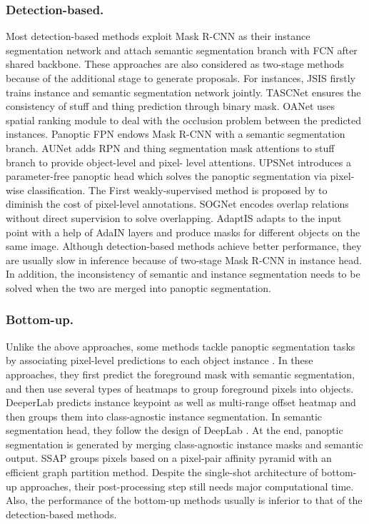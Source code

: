 \documentclass[runningheads]{llncs}
\begin{document}
\subsubsection{Detection-based.}	
Most detection-based methods exploit Mask R-CNN \cite{He2017} as their instance segmentation network and attach semantic segmentation branch with FCN \cite{Long2015} after shared backbone. These approaches are also considered as two-stage methods because of the additional stage to generate proposals. For instances, JSIS \cite{DeGeus2018} firstly trains instance and semantic segmentation network jointly. TASCNet \cite{Li2018a} ensures the consistency of stuff and thing prediction through binary mask. OANet \cite{Liu2019} uses spatial ranking module to deal with the occlusion problem between the predicted instances. Panoptic FPN \cite{DeGeus2018a} endows Mask R-CNN \cite{He2017} with a semantic segmentation branch. AUNet \cite{Li2018c} adds RPN and thing segmentation mask attentions to stuff branch to provide object-level and pixel- level attentions. UPSNet \cite{Xiong2019} introduces a parameter-free panoptic head which solves the panoptic segmentation via pixel-wise classification. The First  weakly-supervised method is proposed by \cite{Li2018b} to diminish the cost of pixel-level annotations. SOGNet \cite{Yang2019a} encodes overlap relations without direct supervision to solve overlapping. AdaptIS \cite{Sofiiuk2019} adapts to the input point with a help of AdaIN layers \cite{Karras2019} and produce masks for different objects on the same image. Although detection-based methods achieve better performance, they are usually slow in inference because of two-stage Mask R-CNN \cite{He2017} in instance head. In addition, the inconsistency of semantic and instance segmentation needs to be solved when the two are merged into panoptic segmentation.

\subsubsection{Bottom-up.}
Unlike the above approaches, some methods tackle panoptic segmentation tasks by associating pixel-level predictions to each object instance \cite{Zhang2016,Zhang2015,Uhrig2016,Liang2018}. In these approaches, they first predict the foreground mask with semantic segmentation, and then use several types of heatmaps to group foreground pixels into objects.
DeeperLab \cite{Yang2019} predicts instance keypoint as well as multi-range offset heatmap and then groups them into class-agnostic instance segmentation. In semantic segmentation head, they follow the design of DeepLab \cite{Chen2018}. At the end, panoptic segmentation is generated by merging class-agnostic instance masks and semantic output. 
SSAP \cite{Porzi2019} groups pixels based on a pixel-pair affinity pyramid with an efficient graph partition method.
Despite the single-shot architecture of bottom-up approaches, their post-processing step still needs major computational time. Also, the performance of the bottom-up methods usually is inferior to that of the detection-based methods.
\end{document}

